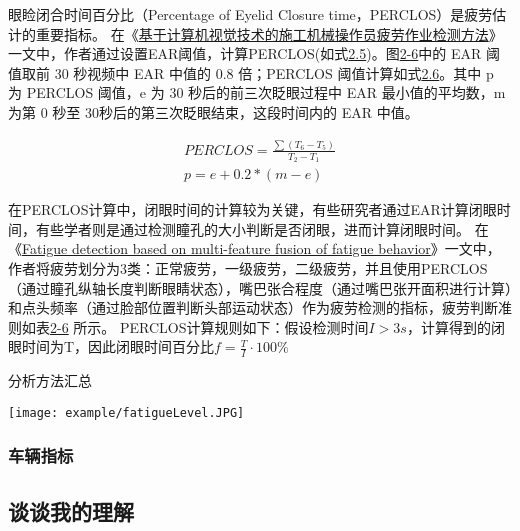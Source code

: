 眼睑闭合时间百分比（Percentage of Eyelid Closure time，PERCLOS）是疲劳估计的重要指标。
在《\href{https://kns.cnki.net/kcms/detail/11.5823.tu.20210201.1703.039.html}{基于计算机视觉技术的施工机械操作员疲劳作业检测方法}》一文中，作者通过设置EAR阈值，计算PERCLOS(如式\href{2.5}{2.5})。图\href{2-6}{2-6}中的 EAR 阈值取前 30 秒视频中 EAR 中值的 0.8 倍；PERCLOS 阈值计算如式\href{2.6}{2.6}。其中 p 为 PERCLOS 阈值，e 为 30 秒后的前三次眨眼过程中 EAR 最小值的平均数，m 为第 0 秒至 30秒后的第三次眨眼结束，这段时间内的 EAR 中值。
\begin{center}
\begin{eqnarray}
PERCLOS = \frac{\sum(T_6 - T_5) }{T_2 - T_1} \\
p = e + 0.2 * (m - e)
\end{eqnarray}
\end{center}

在PERCLOS计算中，闭眼时间的计算较为关键，有些研究者通过EAR计算闭眼时间，有些学者则是通过检测瞳孔的大小判断是否闭眼，进而计算闭眼时间。
在
《\href{https://www.baidu.com/link?url=rLtX9O68zFaOoixH2L36t_Tukm6iwagyZgLiTajxaa9ZjZRDzOhUYp5VlGUJxjfwj5ZdsT4xsrv8GXa2g_oe-fmSsP0BWbzEkzLkdlDj6cN-ddXWcugdKsn8POeyqXpQPKGtqu5FfYIJ-DqI1rg7cF9WRFj9gW-A6kpojIQOJ6dZ_68pC_R8cVd5bY1jW0LA&wd=&eqid=8bac1342000bb654000000056040c52e}{Fatigue detection based on multi-feature fusion of fatigue behavior}》一文中，作者将疲劳划分为3类：正常疲劳，一级疲劳，二级疲劳，并且使用PERCLOS（通过瞳孔纵轴长度判断眼睛状态），嘴巴张合程度（通过嘴巴张开面积进行计算）和点头频率（通过脸部位置判断头部运动状态）作为疲劳检测的指标，疲劳判断准则如表\href{table:2-6}{2-6} 所示。
PERCLOS计算规则如下：假设检测时间$I > 3s$，计算得到的闭眼时间为T，因此闭眼时间百分比$f = \frac{T}{I} \cdot 100\% $

\begin{table}[!htp]

\centering
\caption{分析方法汇总}
\texttt{[image: example/fatigueLevel.JPG]}
\label{table:2-6}

\end{table}

\subsubsection{车辆指标}

\subsection{谈谈我的理解}

